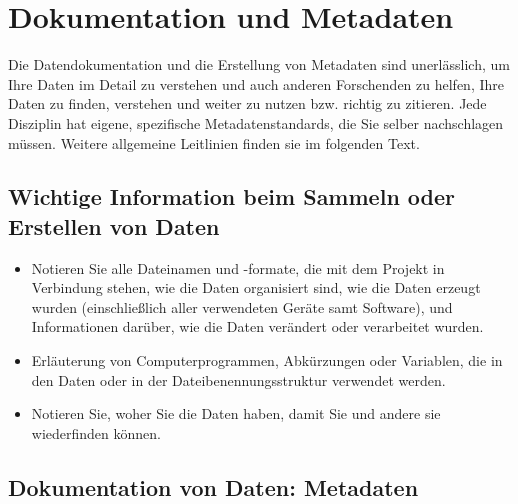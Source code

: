 \section{Dokumentation und Metadaten}

Die Datendokumentation und die Erstellung von Metadaten sind unerlässlich, um
Ihre Daten im Detail zu verstehen und auch anderen Forschenden zu helfen, Ihre
Daten zu finden, verstehen und weiter zu nutzen bzw. richtig zu zitieren. Jede
Disziplin hat eigene, spezifische Metadatenstandards, die Sie selber
nachschlagen müssen. Weitere allgemeine Leitlinien finden sie im folgenden Text.

\subsection{Wichtige Information beim Sammeln oder Erstellen von Daten}

\begin{itemize}
  \item Notieren Sie alle Dateinamen und -formate, die mit dem Projekt in
        Verbindung stehen, wie die Daten organisiert sind, wie die Daten
        erzeugt wurden (einschließlich aller verwendeten Geräte samt Software),
        und Informationen darüber, wie die Daten verändert oder verarbeitet
        wurden.
  \item Erläuterung von Computerprogrammen, Abkürzungen oder Variablen, die in
        den Daten oder in der Dateibenennungsstruktur verwendet werden.
  \item Notieren Sie, woher Sie die Daten haben, damit Sie und andere sie
        wiederfinden können.
\end{itemize}

\subsection{Dokumentation von Daten: Metadaten}\label{sc:data-documentation}

